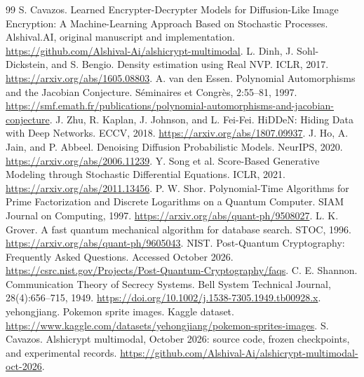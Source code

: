 \documentclass[10pt]{article}
\begin{document}
\begin{thebibliography}{99}
 S. Cavazos. Learned Encrypter-Decrypter Models for
Diffusion-Like Image Encryption: A Machine-Learning Approach Based on
Stochastic Processes. Alshival.AI, original manuscript and implementation.
\url{https://github.com/Alshival-Ai/alshicrypt-multimodal}.
 L. Dinh, J. Sohl-Dickstein, and S. Bengio.
Density estimation using Real NVP. ICLR, 2017.
\url{https://arxiv.org/abs/1605.08803}.
 A. van den Essen. Polynomial Automorphisms and the
Jacobian Conjecture. S\'eminaires et Congr\`es, 2:55--81, 1997.
\url{https://smf.emath.fr/publications/polynomial-automorphisms-and-jacobian-conjecture}.
 J. Zhu, R. Kaplan, J. Johnson, and L. Fei-Fei.
HiDDeN: Hiding Data with Deep Networks. ECCV, 2018.
\url{https://arxiv.org/abs/1807.09937}.
 J. Ho, A. Jain, and P. Abbeel.
Denoising Diffusion Probabilistic Models. NeurIPS, 2020.
\url{https://arxiv.org/abs/2006.11239}.
 Y. Song et al. Score-Based Generative Modeling through Stochastic
Differential Equations. ICLR, 2021.
\url{https://arxiv.org/abs/2011.13456}.
 P. W. Shor. Polynomial-Time Algorithms for Prime Factorization and
Discrete Logarithms on a Quantum Computer. SIAM Journal on Computing, 1997.
\url{https://arxiv.org/abs/quant-ph/9508027}.
 L. K. Grover. A fast quantum mechanical algorithm for database
search. STOC, 1996. \url{https://arxiv.org/abs/quant-ph/9605043}.
 NIST. Post-Quantum Cryptography: Frequently Asked Questions.
Accessed October 2026. \url{https://csrc.nist.gov/Projects/Post-Quantum-Cryptography/faqs}.
 C. E. Shannon. Communication Theory of Secrecy Systems.
Bell System Technical Journal, 28(4):656--715, 1949.
\url{https://doi.org/10.1002/j.1538-7305.1949.tb00928.x}.
 yehongjiang. Pokemon sprite images. Kaggle dataset.
\url{https://www.kaggle.com/datasets/yehongjiang/pokemon-sprites-images}.
 S. Cavazos. Alshicrypt multimodal, October 2026:
source code, frozen checkpoints, and experimental records.
\url{https://github.com/Alshival-Ai/alshicrypt-multimodal-oct-2026}.
\end{thebibliography}
\end{document}
